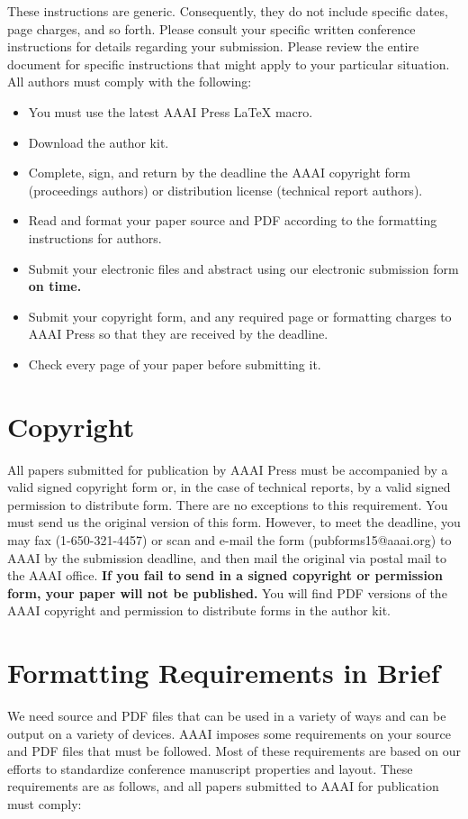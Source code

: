 \documentclass[letterpaper]{article}
\begin{document}
These instructions are generic. Consequently, they do not include specific dates, page charges, and so forth. Please consult your specific written conference instructions for details regarding your submission. Please review the entire document for specific instructions that might apply to your particular situation. All authors must comply with the following:

\begin{itemize}
\item You must use the latest AAAI Press \LaTeX{} macro.
\item Download the author kit.
\item Complete, sign, and return by the deadline the AAAI copyright form (proceedings authors) or distribution license (technical report authors).
\item Read and format your paper source and PDF according to the formatting instructions for authors.
\item Submit your electronic files and abstract using our electronic submission form \textbf{on time.}
\item Submit your copyright form, and any required page or formatting charges to AAAI Press so that they are received by the deadline.
\item Check every page of your paper before submitting it.
\end{itemize}

\section{Copyright}
All papers submitted for publication by AAAI Press must be accompanied by a valid signed copyright form or, in the case of technical reports, by a valid signed permission to distribute form. There are no exceptions to this requirement. You must send us the original version of this form. However, to meet the deadline, you may fax (1-650-321-4457) or scan and e-mail the form (pubforms15@aaai.org) to AAAI by the submission deadline, and then mail the original via postal mail to the AAAI office. \textbf{If you fail to send in a signed copyright or permission form, your paper will not be published.} You will find PDF versions of the AAAI copyright and permission to distribute forms in the author kit.

\section{Formatting Requirements in Brief}
We need source and PDF files that can be used in a variety of ways and can be output on a variety of devices. AAAI imposes some requirements on your source and PDF files that must be followed. Most of these requirements are based on our efforts to standardize conference manuscript properties and layout. These requirements are as follows, and all papers submitted to AAAI for publication must comply:
\end{document}
